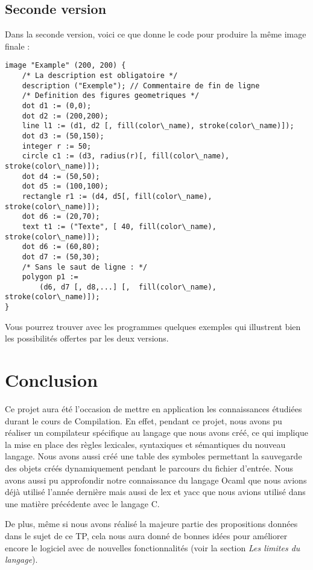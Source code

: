 	\section{Seconde version}
	Dans la seconde version, voici ce que donne le code pour produire la même image finale :
\begin{lstlisting}[morekeywords={circle, dot, integer, image, description, line, rectangle, text, polygon}]
image "Example" (200, 200) {
	/* La description est obligatoire */
	description ("Exemple"); // Commentaire de fin de ligne
	/* Definition des figures geometriques */
	dot d1 := (0,0);
	dot d2 := (200,200);
	line l1 := (d1, d2 [, fill(color\_name), stroke(color\_name)]);
	dot d3 := (50,150);
	integer r := 50;
	circle c1 := (d3, radius(r)[, fill(color\_name), stroke(color\_name)]);
	dot d4 := (50,50);
	dot d5 := (100,100);
	rectangle r1 := (d4, d5[, fill(color\_name), stroke(color\_name)]);
	dot d6 := (20,70);
	text t1 := ("Texte", [ 40, fill(color\_name), stroke(color\_name)]);
	dot d6 := (60,80);
	dot d7 := (50,30);
	/* Sans le saut de ligne : */
	polygon p1 :=
		(d6, d7 [, d8,...] [,  fill(color\_name), stroke(color\_name)]);
}
\end{lstlisting}
	
Vous pourrez trouver avec les programmes quelques exemples qui illustrent bien les possibilités offertes par les deux versions.

\chapter*{Conclusion}
	Ce projet aura été l'occasion de mettre en application les connaissances étudiées durant le cours de Compilation. En effet, pendant ce projet, nous avons pu réaliser un compilateur spécifique au langage que nous avons créé, ce qui  implique la mise en place des règles lexicales, syntaxiques et sémantiques du nouveau langage. Nous avons aussi créé une table des symboles permettant la sauvegarde des objets créés dynamiquement pendant le parcours du fichier d'entrée.
	Nous avons aussi pu approfondir notre connaissance du langage Ocaml que nous avions déjà utilisé l'année dernière mais aussi de lex et yacc que nous avions utilisé dans une matière précédente avec le langage C.
	
	De plus, même si nous avons réalisé la majeure partie des propositions données dans le sujet de ce TP, cela nous aura donné de bonnes idées pour améliorer encore le logiciel avec de nouvelles fonctionnalités (voir la section \emph{Les limites du langage}).
